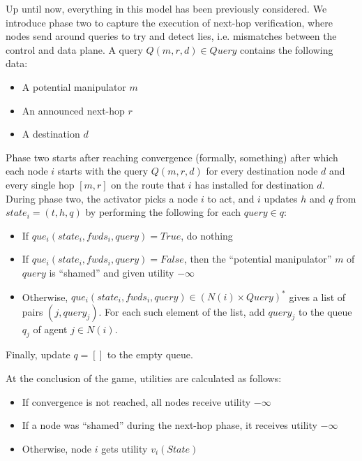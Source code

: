 \documentclass[12pt]{article}
\begin{document}
  Up until now, everything in this model has been previously considered.
  We introduce phase two to capture the execution of next-hop verification,
  where nodes send around queries to try and detect lies,
  i.e. mismatches between the control and data plane.
  A query $Q(m,r,d) \in Query$ contains the following data:
  \begin{itemize}
    \item A potential manipulator $m$
    \item An announced next-hop $r$
    \item A destination $d$
  \end{itemize}
  Phase two starts after reaching convergence (formally, something)
  after which each node $i$ starts with the query $Q(m,r,d)$ for every
  destination node $d$ and every single hop $[m,r]$ on the route
  that $i$ has installed for destination $d$.
  During phase two, the activator picks a node $i$ to act,
  and $i$ updates $h$ and $q$ from $state_i=(t,h,q)$ by performing the following
  for each $query \in q$:
  \begin{itemize}
    \item If $que_i(state_i, fwds_i, query) = True$, do nothing
    \item If $que_i(state_i, fwds_i, query) = False$, then the
      ``potential manipulator'' $m$ of $query$ is ``shamed''
      and given utility $-\infty$
    \item Otherwise, $que_i(state_i, fwds_i, query) \in (N(i)\times Query)^*$
      gives a list of pairs $(j, query_j)$.
      For each such element of the list, add $query_j$ to the queue $q_j$
      of agent $j\in N(i)$.
  \end{itemize}
  Finally, update $q = []$ to the empty queue.

  At the conclusion of the game, utilities are calculated as follows:
  \begin{itemize}
    \item If convergence is not reached, all nodes receive utility $-\infty$
    \item If a node was ``shamed'' during the next-hop phase,
      it receives utility $-\infty$
    \item Otherwise, node $i$ gets utility $v_i(State)$
  \end{itemize}
\end{document}
